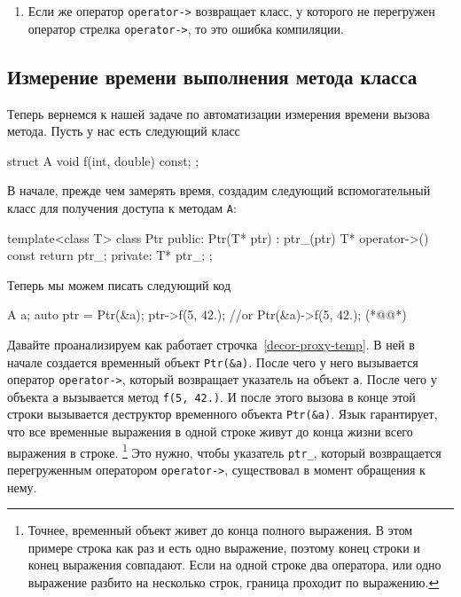 \begin{enumerate}
\begin{cppcode}
int main() {
  C c;
  c->f(5, 42.);
}
\end{cppcode}
В этом случае происходит следующее.
В начале для объекта \verb"c" вызывается его перегруженный оператор стрелка, который вернет объект класса \verb"B".
После для него вызовется его перегруженный оператор стрелка и он вернет указатель на \verb"A".
И уже последний вызов позовет по указателю метод \verb"f" с указанными параметрами.
То есть этот вызов будет означать
\begin{cppcode}
int main() {
  ((c.operator->()).operator->())->f(5, 42.);
}
\end{cppcode}
Такие вызовы лево ассоциативны по стрелкам и допускают любую глубину рекурсии.
Главное, чтобы в конце последний оператор \verb"operator->" возвращал указатель.

\item Если же оператор \verb"operator->" возвращает класс, у которого не перегружен оператор стрелка \verb"operator->", то это ошибка компиляции.
\end{enumerate}

\subsection{Измерение времени выполнения метода класса}

Теперь вернемся к нашей задаче по автоматизации измерения времени вызова метода.
Пусть у нас есть следующий класс
\begin{cppcode}
struct A {
  void f(int, double) const;
};
\end{cppcode}
В начале, прежде чем замерять время, создадим следующий вспомогательный класс для получения доступа к методам \verb"A":
\begin{cppcode}
template<class T>
class Ptr {
public:
  Ptr(T* ptr) : ptr_(ptr) {}
  T* operator->() const {
    return ptr_;
  }
private:
  T* ptr_;
};
\end{cppcode}
Теперь мы можем писать следующий код
\begin{cppcode}
A a;
auto ptr = Ptr(&a);
ptr->f(5, 42.);
//or
Ptr(&a)->f(5, 42.); (*@@*)
\end{cppcode}
Давайте проанализируем как работает строчка~\ref{decor-proxy-temp}.
В ней в начале создается временный объект \verb"Ptr(&a)".
После чего у него вызывается оператор \verb"operator->", который возвращает указатель на объект \verb"a".
После чего у объекта \verb"a" вызывается метод \verb"f(5, 42.)".
И после этого вызова в конце этой строки вызывается деструктор временного объекта \verb"Ptr(&a)".
Язык гарантирует, что все временные выражения в одной строке живут до конца жизни всего выражения в строке.%
\footnote{Точнее, временный объект живет до конца полного выражения.
В этом примере строка как раз и есть одно выражение, поэтому конец строки и конец выражения совпадают.
Если на одной строке два оператора, или одно выражение разбито на несколько строк, граница проходит по выражению.}
Это нужно, чтобы указатель \verb"ptr_", который возвращается перегруженным оператором \verb"operator->", существовал в момент обращения к нему.

